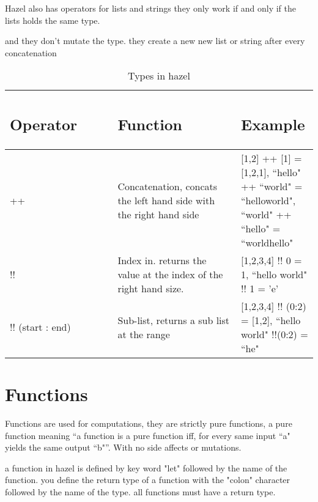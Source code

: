 \documentclass{article}
\begin{document}
Hazel also has operators for lists and strings 
they only work if and only if the lists holds the same type. 

and they don't mutate the type. they create a new new list or string after every concatenation

\begin{table}[H]
    \centering
    \begin{tabular}{p{0.35\linewidth} | p{0.4\linewidth}| p{0.4\linewidth} | }
      
\subsection*{Operator} & \subsection*{Function} & \subsection*{Example}
 \\ \hline
      ++ & Concatenation, concats the left hand side with the right hand side & [1,2] ++ [1] = [1,2,1], ``hello" ++ ``world" = ``helloworld", ``world" ++ ``hello" =  ``worldhello" \\ \hline
      !! & Index in. returns the value at the index of the right hand size.  &  [1,2,3,4] !! 0 = 1, ``hello world" !! 1 = 'e' \\ \hline
      !! (start : end) & Sub-list, returns a sub list at the range  & [1,2,3,4] !! (0:2) = [1,2], ``hello world" !!(0:2) = ``he" \\ \hline      
    \end{tabular}
        \caption{Types in hazel}
\end{table}


\section{Functions}

Functions are used for computations, they are strictly pure functions, a pure function meaning ``a function is a pure function iff, for every same input ``a" yields the same output ``b"”. With no side affects or mutations.

a function in hazel is defined by key word "let" followed by the name of the function.  
you define the return type of a function with the "colon" character followed by the name of the type.
all functions must have a return type. 
\end{document}
